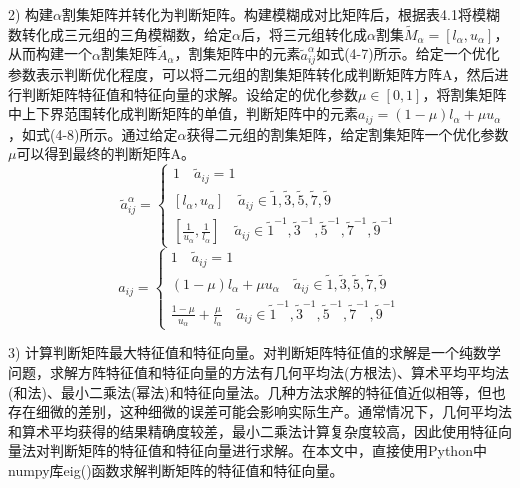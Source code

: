 2) 构建$\alpha$割集矩阵并转化为判断矩阵。构建模糊成对比矩阵后，根据表4.1将模糊数转化成三元组的三角模糊数，给定$\alpha$后，将三元组转化成$\alpha$割集$\widetilde{M}_{\alpha}=[l_{\alpha},u_{\alpha}]$，从而构建一个$\alpha$割集矩阵$\widetilde{A}_{\alpha}$，割集矩阵中的元素$\widetilde{a}_{ij}^{\alpha}$如式(4-7)所示。给定一个优化参数表示判断优化程度，可以将二元组的割集矩阵转化成判断矩阵方阵A，然后进行判断矩阵特征值和特征向量的求解。设给定的优化参数$\mu\in[0,1]$，将割集矩阵中上下界范围转化成判断矩阵的单值，判断矩阵中的元素$a_{ij}=(1-\mu)l_{\alpha}+\mu u_{\alpha}$，如式(4-8)所示。通过给定$\alpha$获得二元组的割集矩阵，给定割集矩阵一个优化参数$\mu$可以得到最终的判断矩阵A。
\begin{equation}
\widetilde{a}_{ij}^{\alpha} = \left\{\begin{array}{l}
1 \quad \widetilde{a}_{ij}=1 \\ [0.2cm]
[l_{\alpha},u_{\alpha}] \quad \widetilde{a}_{ij}\in{\widetilde{1},\widetilde{3},\widetilde{5},\widetilde{7},\widetilde{9}} \\ [0.2cm]
[\frac{1}{u_{\alpha}},\frac{1}{l_{\alpha}}] \quad \widetilde{a}_{ij}\in{\widetilde{1}^{-1},\widetilde{3}^{-1},\widetilde{5}^{-1},\widetilde{7}^{-1},\widetilde{9}^{-1}}
\end{array}\right.
\end{equation}
\begin{equation}
a_{ij} = \left\{\begin{array}{l}
1 \quad \widetilde{a}_{ij}=1 \\ [0.2cm]
(1-\mu)l_{\alpha}+\mu u_{\alpha} \quad \widetilde{a}_{ij}\in{\widetilde{1},\widetilde{3},\widetilde{5},\widetilde{7},\widetilde{9}} \\ [0.2cm]
\frac{1-\mu}{u_{\alpha}}+\frac{\mu}{l_{\alpha}} \quad \widetilde{a}_{ij}\in{\widetilde{1}^{-1},\widetilde{3}^{-1},\widetilde{5}^{-1},\widetilde{7}^{-1},\widetilde{9}^{-1}}
\end{array}\right.
\end{equation}

3) 计算判断矩阵最大特征值和特征向量。对判断矩阵特征值的求解是一个纯数学问题，求解方阵特征值和特征向量的方法有几何平均法(方根法)、算术平均平均法(和法)、最小二乘法(幂法)和特征向量法。几种方法求解的特征值近似相等，但也存在细微的差别，这种细微的误差可能会影响实际生产。通常情况下，几何平均法和算术平均获得的结果精确度较差，最小二乘法计算复杂度较高，因此使用特征向量法对判断矩阵的特征值和特征向量进行求解。在本文中，直接使用Python中numpy库eig()函数求解判断矩阵的特征值和特征向量。

